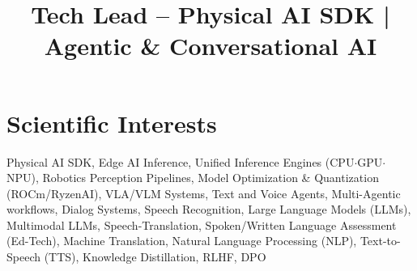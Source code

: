 \documentclass[11pt,a4paper,sans]{moderncv} %
\title{Tech Lead – Physical AI SDK | Agentic \& Conversational AI}
\begin{document}
\makecvtitle %
\vspace{-15mm}
\section{Scientific Interests}
{Physical AI SDK, Edge AI Inference, Unified Inference Engines (CPU$\cdot$GPU$\cdot$NPU), Robotics Perception Pipelines, Model Optimization \& Quantization (ROCm/RyzenAI), VLA/VLM Systems, Text and Voice Agents, Multi-Agentic workflows, Dialog Systems, Speech Recognition, Large Language Models (LLMs), Multimodal LLMs, Speech-Translation, Spoken/Written Language Assessment (Ed-Tech), Machine Translation, Natural Language Processing (NLP), Text-to-Speech (TTS), Knowledge Distillation, RLHF, DPO}

\end{document}
